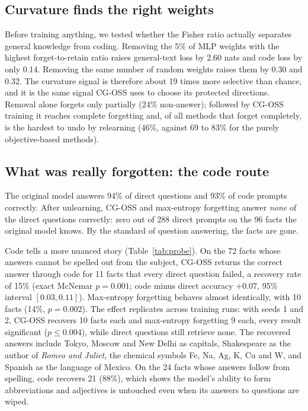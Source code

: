 \documentclass{article}
\begin{document}
\subsection{Curvature finds the right weights}
\label{sec:prune}
Before training anything, we tested whether the Fisher ratio actually separates general knowledge from coding. Removing the 5\% of MLP weights with the highest forget-to-retain ratio raises general-text loss by 2.60 nats and code loss by only 0.14. Removing the same number of random weights raises them by 0.30 and 0.32. The curvature signal is therefore about 19 times more selective than chance, and it is the same signal CG-OSS uses to choose its protected directions. Removal alone forgets only partially (24\% non-answer); followed by CG-OSS training it reaches complete forgetting and, of all methods that forget completely, is the hardest to undo by relearning (46\%, against 69 to 83\% for the purely objective-based methods).

\subsection{What was really forgotten: the code route}
\label{sec:probe}
The original model answers 94\% of direct questions and 93\% of code prompts correctly. After unlearning, CG-OSS and max-entropy forgetting answer \emph{none} of the direct questions correctly: zero out of 288 direct prompts on the 96 facts the original model knows. By the standard of question answering, the facts are gone.

Code tells a more nuanced story (Table~\ref{tab:probe}). On the 72 facts whose answers cannot be spelled out from the subject, CG-OSS returns the correct answer through code for 11 facts that every direct question failed, a recovery rate of 15\% (exact McNemar $p=0.001$; code minus direct accuracy $+0.07$, 95\% interval $[0.03, 0.11]$). Max-entropy forgetting behaves almost identically, with 10 facts (14\%, $p=0.002$). The effect replicates across training runs: with seeds 1 and 2, CG-OSS recovers 10 facts each and max-entropy forgetting 9 each, every result significant ($p\le 0.004$), while direct questions still retrieve none. The recovered answers include Tokyo, Moscow and New Delhi as capitals, Shakespeare as the author of \emph{Romeo and Juliet}, the chemical symbols Fe, Na, Ag, K, Cu and W, and Spanish as the language of Mexico. On the 24 facts whose answers follow from spelling, code recovers 21 (88\%), which shows the model's ability to form abbreviations and adjectives is untouched even when its answers to questions are wiped.
\end{document}

